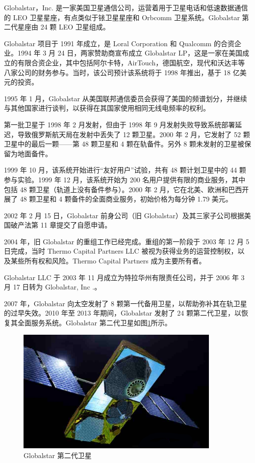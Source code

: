 Globalstar，Inc. 是一家美国卫星通信公司，运营着用于卫星电话和低速数据通信的 LEO 卫星星座，有点类似于铱卫星星座和 Orbcomm 卫星系统。Globalstar 第二代星座由 24 颗 LEO 卫星组成。

Globalstar 项目于 1991 年成立，是 Loral Corporation 和 Qualcomm 的合资企业。1994 年 3 月 24 日，两家赞助商宣布成立 Globalstar LP，这是一家在美国成立的有限合资企业，其中包括阿尔卡特，AirTouch，德国航空，现代和沃达丰等八家公司的财务参与。当时，该公司预计该系统将于 1998 年推出，基于 18 亿美元的投资。

1995 年 1 月，Globalstar 从美国联邦通信委员会获得了美国的频谱划分，并继续与其他国家进行谈判，以获得在其国家使用相同无线电频率的权利。

第一批卫星于 1998 年 2 月发射，但由于 1998 年 9 月发射失败导致系统部署延迟，导致俄罗斯航天局在发射中丢失了 12 颗卫星。2000 年 2 月，它发射了 52 颗卫星中的最后一颗——第 48 颗卫星和 4 颗在轨备件。另外 8 颗未发射的卫星被保留为地面备件。

1999 年 10 月，该系统开始进行“友好用户”试验，共有 48 颗计划卫星中的 44 颗参与实验。1999 年 12 月，该系统开始为 200 名用户提供有限的商业服务，其中包括 48 颗卫星（轨道上没有备件参与）。2000 年 2 月，它在北美、欧洲和巴西开展了 48 颗卫星和 4 颗备件的全面商业服务，初始价格为每分钟 1.79 美元。

2002 年 2 月 15 日，Globalstar 前身公司（旧 Globalstar）及其三家子公司根据美国破产法第 11 章提交了自愿申请。

2004 年，旧 Globalstar 的重组工作已经完成。重组的第一阶段于 2003 年 12 月 5 日完成，当时 Thermo Capital Partners LLC 被视为获得业务的运营控制权，以及某些所有权和风险。Thermo Capital Partners 成为主要所有者。

Globalstar LLC 于 2003 年 11 月成立为特拉华州有限责任公司，并于 2006 年 3 月 17 日转为 Globalstar, Inc .。

2007 年，Globalstar 向太空发射了 8 颗第一代备用卫星，以帮助弥补其在轨卫星的过早失效。2010 年至 2013 年期间，Globalstar 发射了 24 颗第二代卫星，以恢复其全面服务系统。Globalstar 第二代卫星如图\ref{fig:globalstar-satellite}所示。

\begin{figure}[!htb]
\centering
\includegraphics[width=10cm]{pic/globalstar-satellite.jpg}
\caption{Globalstar 第二代卫星\protect\footnotemark}
\label{fig:globalstar-satellite}
\end{figure}

